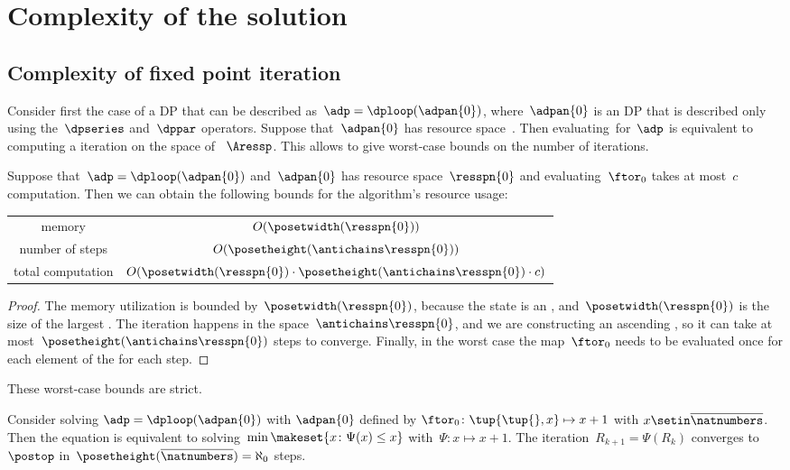 
\section{Complexity of the solution}

\subsection{Complexity of fixed point iteration}

Consider first the case of a DP that can be described as~$\adp=\dploop(\adpan{0})$, where~$\adpan{0}$ is an DP that is described only using the~$\dpseries$ and~$\dppar$ operators.
Suppose that~$\adpan{0}$ has resource space~\ressp.
Then evaluating~\ftor for~$\adp$ is equivalent to computing a  iteration on the space of ~$\Aressp$.
This allows to give worst-case bounds on the number of iterations.

\begin{proposition}
    \label{prop:complexity}
    Suppose that~$\adp=\dploop(\adpan{0})$ and~$\adpan{0}$ has resource space~$\resspn{0}$ and evaluating~$\ftor_{0}$ takes at most~$c$ computation.
    Then we can obtain the following bounds for the algorithm's resource usage:

    \smallskip{}
    \begin{tabular}{cc}
        memory            & $O(\posetwidth(\resspn{0}))$\tabularnewline
        number of steps   & $O(\posetheight(\antichains\resspn{0}))$\tabularnewline
        total computation & $O(\posetwidth(\resspn{0})\cdot\posetheight(\antichains\resspn{0})\cdot c)$\tabularnewline
    \end{tabular}

\end{proposition}
\begin{proof}
    The memory utilization is bounded by~$\posetwidth(\resspn{0})$, because the state is an , and~$\posetwidth(\resspn{0})$ is the size of the largest .
    The iteration happens in the space~$\antichains\resspn{0}$, and we are constructing an ascending , so it can take at most~$\posetheight(\antichains\resspn{0})$ steps to converge.
    Finally, in the worst case the map~$\ftor_{0}$ needs to be evaluated once for each element of the  for each step.
\end{proof}
These worst-case bounds are strict.
\begin{example}
    Consider solving $\adp=\dploop(\adpan{0})$ with $\adpan{0}$ defined by $\ftor_{0}\colon\tup{\tup{},x} \mapsto x+1$ with $x\setin\overline{\natnumbers}$.
    Then the  equation is equivalent to solving~$\min\makeset{x\colon\Psi(x)\leq x}$ with~$\Psi:x\mapsto x+1$.
    The iteration~$R_{k+1}=\Psi(R_{k})$ converges to~$\postop$ in~$\posetheight(\overline{\natnumbers})=\aleph_{0}$ steps.
\end{example}

